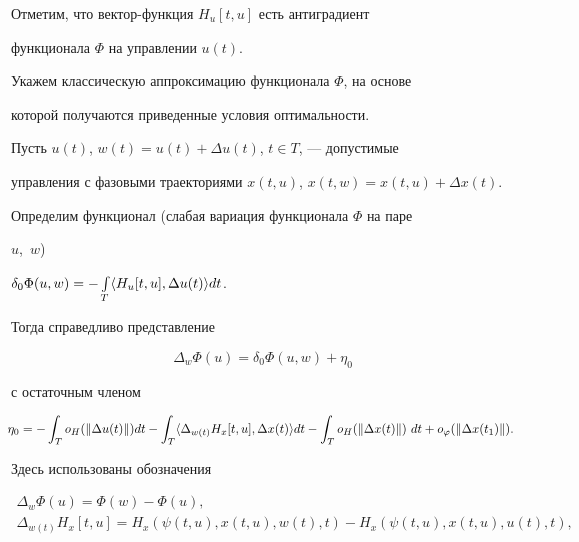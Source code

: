 Отметим, что вектор-функция $H_u[t,u]$ есть антиградиент 


функционала $\Phi$ на управлении $u(t)$.


Укажем классическую аппроксимацию функционала $\Phi$, на основе


которой получаются приведенные условия оптимальности.





Пусть $u(t)$, $w(t)=u(t)+\Delta u(t)$, $t \in T$, --- допустимые


управления с фазовыми траекториями $x(t, u)$, $x(t, w)=x(t, u)+


\Delta x(t)$.





Определим функционал (слабая вариация функционала $\Phi$ на паре


$u$,~$w$)


$\delta_{0} \Phi(u, w)=\linebreak -\int\limits_{T}


\langle H_{u}[t, u], \Delta u(t)\rangle dt$.


Тогда справедливо представление


\begin{equation}


\Delta_{w} \Phi(u)=\delta_{0} \Phi(u, w)+\eta_{0}


\end{equation}


с остаточным членом


\begin{equation}


\negthickspace \eta_{0}=- \int_{T} o_{H}(\| \Delta u(t) \|) dt -


\int_{T} \langle \Delta_{w(t)} H_{x}[t, u], \Delta x(t)\rangle dt -


\int_{T} o_{H}(\| \Delta x(t) \|)~dt+o_{\varphi}(\| \Delta x(t_{1}) \|).


\end{equation}





Здесь использованы обозначения


\begin{gather*}


\Delta_{w} \Phi(u)=\Phi(w) - \Phi(u),\\


\Delta_{w(t)} H_{x}[t, u]=H_{x}(\psi(t, u), x(t, u), w(t),t) -


H_{x}(\psi(t, u), x(t, u), u(t),t),


\end{gather*}


